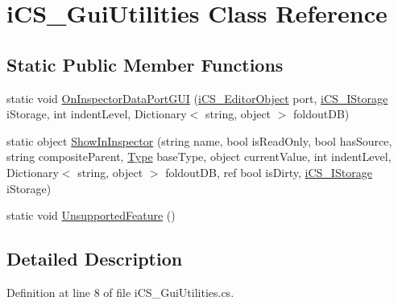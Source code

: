 \hypertarget{classi_c_s___gui_utilities}{\section{i\+C\+S\+\_\+\+Gui\+Utilities Class Reference}
\label{classi_c_s___gui_utilities}
}
\subsection*{Static Public Member Functions}
\begin{DoxyCompactItemize}
\item 
static void \hyperlink{classi_c_s___gui_utilities_afab2e206fd8c545045987e5cc928fe79}{On\+Inspector\+Data\+Port\+G\+U\+I} (\hyperlink{classi_c_s___editor_object}{i\+C\+S\+\_\+\+Editor\+Object} port, \hyperlink{classi_c_s___i_storage}{i\+C\+S\+\_\+\+I\+Storage} i\+Storage, int indent\+Level, Dictionary$<$ string, object $>$ foldout\+D\+B)
\item 
static object \hyperlink{classi_c_s___gui_utilities_af6cd2aa437fe1a3a7e50526c6e651295}{Show\+In\+Inspector} (string name, bool is\+Read\+Only, bool has\+Source, string composite\+Parent, \hyperlink{i_c_s___object_type_enum_8cs_ae6c3dd6d8597380b56d94908eb431547aa1fa27779242b4902f7ae3bdd5c6d508}{Type} base\+Type, object current\+Value, int indent\+Level, Dictionary$<$ string, object $>$ foldout\+D\+B, ref bool is\+Dirty, \hyperlink{classi_c_s___i_storage}{i\+C\+S\+\_\+\+I\+Storage} i\+Storage)
\item 
static void \hyperlink{classi_c_s___gui_utilities_a4d555d813d6e48d360c6737c0e5492bf}{Unsupported\+Feature} ()
\end{DoxyCompactItemize}


\subsection{Detailed Description}


Definition at line 8 of file i\+C\+S\+\_\+\+Gui\+Utilities.\+cs.



